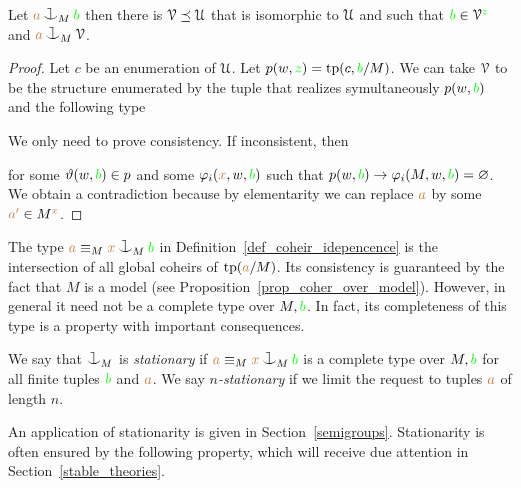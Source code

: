\begin{proposition}\label{prop_saturate_heir}
  Let ${\mr a}\cnonfork_M{\gr b}$ then there is $\EuScript V\preceq\EuScript U$ that is isomorphic to $\EuScript U$ and such that ${\color{green} b}\in\EuScript V^{\color{green} z}$ and ${\mr a}\cnonfork_M\V$.
\end{proposition}

\begin{proof}
  Let $c$ be an enumeration of $\EuScript U$.
  Let $p(w,{\color{green} z})={\rm tp}(c,{\color{green} b}/M)$.
  We can take $\EuScript V$ to be the structure enumerated by the tuple that realizes symultaneously $p(w,{\color{green} b}) $ and the following type 


  We only need to prove consistency.
  If inconsistent, then 

  
  for some $\vartheta(w,{\color{green} b})\in p$ and some $\varphi_i({\color{brown} x},w,{\color{green} b})$ such that $p(w,{\color{green} b})\rightarrow\varphi_i(M,w,{\color{green} b})=\varnothing$.
  We obtain a contradiction because by elementarity we can replace ${\color{brown} a}$ by some ${\color{brown} a'}\in M^{\color{brown} x}$.
\end{proof}


The type ${\mr a}\equiv_M{\mr x}\cnonfork_M{\gr b}$ in Definition~\ref{def_coheir_idepencence} is the intersection of all global coheirs of ${\rm tp}({\color{brown} a}/M)$.
%
Its consistency is guaranteed by the fact that $M$ is a model (see Proposition~\ref{prop_coher_over_model}).
%
However, in general it need not be a complete type over $M,{\color{green} b}$.
%
In fact, its completeness of this type is a property with important consequences.

\begin{definition}\label{def_coheir_stationary} We say that $\cnonfork_M$ is \emph{stationary\/} if ${\mr a}\equiv_M{\mr x}\cnonfork_M{\gr b}$ is a complete type over $M,{\color{green} b}$ for all finite tuples ${\color{green} b}$ and ${\color{brown} a}$.
We say \emph{$n$-stationary\/} if we limit the request to tuples ${\color{brown} a}$ of length $n$.
\end{definition}

An application of stationarity is given in Section~\ref{semigroups}.
Stationarity is often ensured by the following property, which will receive due attention in Section~\ref{stable_theories}.


